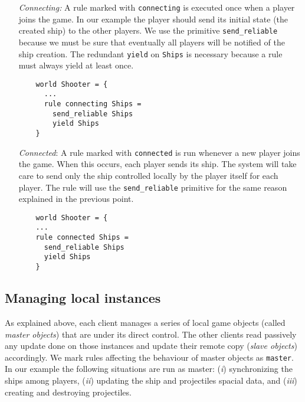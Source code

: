\begin{itemize}
	\item[\textit{Connecting:}] A rule marked with \texttt{connecting} is executed once when a player joins the game. In our example the player should send its initial state (the created ship) to the other players. We use the primitive \texttt{send\_reliable} because we must be sure that eventually all players will be notified of the ship creation. The redundant \texttt{yield} on \texttt{Ships} is necessary because a rule must always yield at least once.
	\begin{lstlisting}
	world Shooter = {
	  ...
	  rule connecting Ships =
	    send_reliable Ships
	    yield Ships
	}
	\end{lstlisting}
	
	\item [\textit{Connected}:] A rule marked with \texttt{connected} is run whenever a new player joins the game. When this occurs, each player sends its ship. The system will take care to send only the ship controlled locally by the player itself for each player. The rule will use the \texttt{send\_reliable} primitive for the same reason explained in the previous point.
	\begin{lstlisting}
	world Shooter = {
	...
	rule connected Ships =
	  send_reliable Ships
	  yield Ships
	}
	\end{lstlisting}
\end{itemize}

\subsection*{Managing local instances}
As explained above, each client manages a series of local game objects (called \textit{master objects}) that are under its direct control. The other clients read passively any update done on those instances and update their remote copy  (\textit{slave objects}) accordingly. We mark rules affecting the behaviour of master objects as \texttt{master}. In our example the following situations are run as master: (\textit{i}) synchronizing the ships among players, (\textit{ii}) updating the ship and projectiles spacial data, and (\textit{iii}) creating and destroying projectiles.

